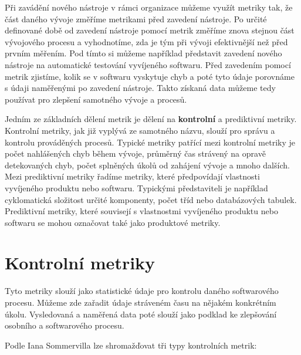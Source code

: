 \documentclass[czech,master]{diploma}
\begin{document}
Při zavádění nového nástroje v rámci organizace můžeme využít metriky tak, že část daného vývoje změříme metrikami před zavedení nástroje. Po určité definované době od zavedení nástroje pomocí metrik změříme znova stejnou část vývojového procesu a vyhodnotíme, zda je tým při vývoji efektivnější než před prvním měřením. Pod tímto si můžeme například představit zavedení nového nástroje na automatické testování vyvíjeného softwaru. Před zavedením pomocí metrik zjistíme, kolik se v softwaru vyskytuje chyb a poté tyto údaje porovnáme s údaji naměřenými po zavedení nástroje. Takto získaná data můžeme tedy používat pro zlepšení samotného vývoje a procesů.

Jedním ze základních dělení metrik je dělení na \textbf{kontrolní} a prediktivní metriky. Kontrolní metriky, jak již vyplývá ze samotného názvu, slouží pro správu a kontrolu prováděných procesů. Typické metriky patřící mezi kontrolní metriky je počet nahlášených chyb během vývoje, průměrný čas strávený na opravě detekovaných chyb, počet splněných úkolů od zahájení vývoje a mnoho dalších. Mezi prediktivní metriky řadíme metriky, které předpovídají vlastnosti vyvíjeného produktu nebo softwaru. Typickými představiteli je například cyklomatická složitost určité komponenty, počet tříd nebo databázových tabulek. Prediktivní metriky, které souvisejí s vlastnostmi vyvíjeného produktu nebo softwaru se mohou označovat také jako produktové metriky. \cite{ref:metric_definition}

\section{Kontrolní metriky}
Tyto metriky slouží jako statistické údaje pro kontrolu daného softwarového procesu. Můžeme zde zařadit údaje stráveném času na nějakém konkrétním úkolu. Vysledovaná a naměřená data poté slouží jako podklad ke zlepšování osobního a softwarového procesu.

Podle Iana Sommervilla \cite{ref:kontrolni_metriky} lze shromažďovat tři typy kontrolních metrik:
\end{document}
